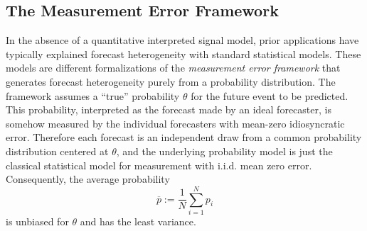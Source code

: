 \documentclass[11pt]{article}
\theoremstyle{definition}
\theoremstyle{definition}
\def\pb{\overline{p}}
\begin{document}
%

\subsection{The Measurement Error Framework}
\label{ss:measurement}
In the absence of a quantitative
interpreted signal model, prior applications have typically explained forecast heterogeneity  with standard statistical models. These models are different formalizations of  the \textit{measurement error framework} that generates forecast heterogeneity purely from a probability distribution. The framework assumes a ``true'' probability
$\theta$  for the future event to be predicted. This probability, interpreted as the  forecast made by an ideal forecaster, is somehow measured by the individual forecasters with mean-zero idiosyncratic error.  Therefore each forecast is an independent draw from a common
probability distribution centered at $\theta$, and the underlying probability model is just the 
classical statistical model for measurement with i.i.d. mean zero error.  Consequently, the average probability
$$\pb := \frac{1}{N}\sum_{i=1}^N
p_i$$
is unbiased for $\theta$ and has the least
variance. 
\end{document}
